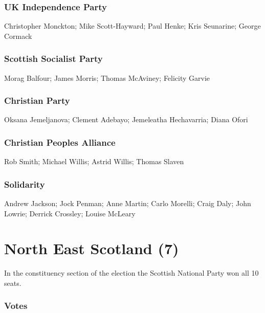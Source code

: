 \begin{resultsiii}
\subsubsection*{UK Independence Party}
Christopher Monckton; Mike Scott-Hayward; Paul Henke; Kris Seunarine; George Cormack
\subsubsection*{Scottish Socialist Party}
Morag Balfour; James Morris; Thomas Mc\-Av\-in\-ey; Felicity Garvie
\subsubsection*{Christian Party}
Oksana Jemeljanova; Clement Adebayo; Jemeleatha Hechavarria; Diana Ofori
\subsubsection*{Christian Peoples Alliance}
Rob Smith; Michael Willis; Astrid Willis; Thomas Slaven
\subsubsection*{Solidarity}
Andrew Jackson; Jock Penman; Anne Martin; Carlo Morelli; Craig Daly; John Lowrie; Derrick Crossley; Louise McLeary
\end{resultsiii}

\vfill

\section[North East Scotland]{North East Scotland (7)}

In the constituency section of the election the Scottish National Party won all 10 seats.

\vfill

\subsubsection*{Votes}

